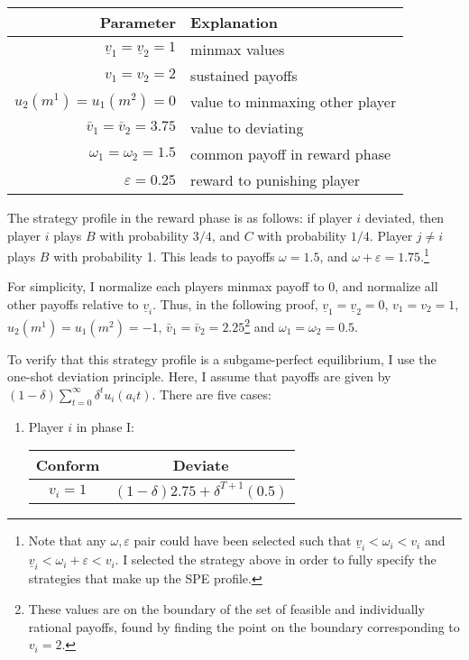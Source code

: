 \documentclass[11pt]{article}
\begin{document}
\begin{enumerate}
\begin{enumerate}
		\begin{table*}[!ht]
			\centering
			\begin{tabular}{r|l} 
				Parameter & Explanation \\ \hline 
				$ \underline{v}_1 = \underline{v}_2 = 1 $ & minmax values\\
				$ v_1 = v_2 = 2 $ & sustained payoffs\\
				$ u_2(m^1) = u_1(m^2) = 0 $ & value to minmaxing other player \\
				$ \bar{v}_1 = \bar{v}_2 = 3.75 $ & value to deviating \\
				$ \omega_1 = \omega_2 = 1.5 $ & common payoff in reward phase\\
				$ \varepsilon = 0.25 $ & reward to punishing player \\
			\end{tabular}
		\end{table*}
		The strategy profile in the reward phase is as follows: if player $ i $ deviated, then player $ i $ plays $ B $ with probability $ 3/4 $, and $ C $ with probability $ 1/4 $. Player $ j\neq i $ plays $ B $ with probability 1. This leads to payoffs $ \omega = 1.5 $, and $ \omega + \varepsilon = 1.75 $.\footnote{Note that any $ \omega,\varepsilon $ pair could have been selected such that $ \underline{v}_i < \omega_i < v_i $ and $ \underline{v}_i < \omega_i + \varepsilon < v_i $. I selected the strategy above in order to fully specify the strategies that make up the SPE profile.}
		
		For simplicity, I normalize each players minmax payoff to 0, and normalize all other payoffs relative to $ \underline{v}_i $. Thus, in the following proof, $ \underline{v}_1 = \underline{v}_2 = 0 $, $ v_1 = v_2 = 1 $, $ u_2(m^1) = u_1(m^2) = -1 $, $ \bar{v}_1 = \bar{v}_2 = 2.25 $\footnote{These values are on the boundary of the set of feasible and individually rational payoffs, found by finding the point on the boundary corresponding to $ v_i = 2$.} and $ \omega_1 = \omega_2 = 0.5 $. 
		
		To verify that this strategy profile is a subgame-perfect equilibrium, I use the one-shot deviation principle. Here, I assume that payoffs are given by $ (1 - \delta)\sum_{t = 0}^{\infty}\delta^t u_i(a_it) $. There are five cases: \newpage 
		\begin{enumerate}[label = \roman{*})]
			\item Player $ i $ in phase I: 
			\begin{table}[!h]
				\centering
				\begin{tabular}{c|c}
					Conform & Deviate \\ \hline
					$ v_i = 1 $ & $ (1 - \delta)2.75 + \delta^{T+1}(0.5) $
				\end{tabular}
			\end{table}
		

\end{enumerate}
\end{enumerate}
\end{enumerate}
\end{document}
